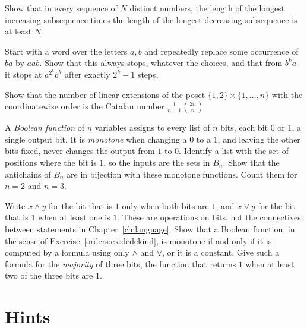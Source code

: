 \begin{exercise}[$\star$]\label{orders:ex:esproduct}
Show that in every sequence of $N$ distinct numbers, the length of the longest increasing subsequence times the length of the longest decreasing subsequence is at least $N$.
\end{exercise}

\begin{exercise}[$\star\star$]\label{orders:ex:rewriting}
Start with a word over the letters $a,b$ and repeatedly replace some occurrence of $ba$ by $aab$. Show that this always stops, whatever the choices, and that from $b^ka$ it stops at $a^{2^k}b^k$ after exactly $2^k-1$ steps.
\end{exercise}

\begin{exercise}[$\star\star$]\label{orders:ex:youngtableaux}
Show that the number of linear extensions of the poset $\{1,2\}\times\{1,\dots,n\}$ with the coordinatewise order is the Catalan number $\frac1{n+1}\binom{2n}n$.
\end{exercise}

\begin{exercise}[$\star\star$]\label{orders:ex:dedekind}
A \emph{Boolean function} of $n$ variables assigns to every list of $n$ bits, each bit $0$ or $1$, a single output bit. It is \emph{monotone} when changing a $0$ to a $1$, and leaving the other bits fixed, never changes the output from $1$ to $0$. Identify a list with the set of positions where the bit is $1$, so the inputs are the sets in $B_n$. Show that the antichains of $B_n$ are in bijection with these monotone functions. Count them for $n=2$ and $n=3$.
\end{exercise}

\begin{exercise}[$\star\star$]\label{orders:ex:monotone}
Write $x\land y$ for the bit that is $1$ only when both bits are $1$, and $x\lor y$ for the bit that is $1$ when at least one is $1$. These are operations on bits, not the connectives between statements in Chapter~\ref{ch:language}. Show that a Boolean function, in the sense of Exercise~\ref{orders:ex:dedekind}, is monotone if and only if it is computed by a formula using only $\land$ and $\lor$, or it is a constant. Give such a formula for the \emph{majority} of three bits, the function that returns $1$ when at least two of the three bits are $1$.
\end{exercise}

\section{Hints}

